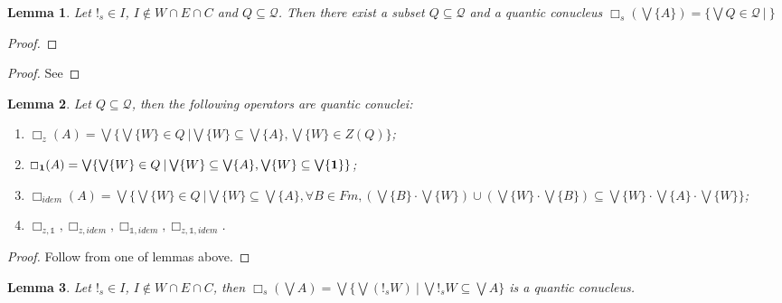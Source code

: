 \documentclass[a4paper]{article}
\newtheorem{lemma}{Lemma}
\begin{document}
\begin{lemma}
  Let $!_s \in I$, $I \notin W \cap E \cap C$ and $Q \subseteq \mathcal{Q}$.
  Then there exist a subset $Q \subseteq \mathcal{Q}$ and
  a quantic conucleus $\Box_s (\bigvee \{ A \}) = \{ \bigvee Q \in \mathcal{Q} \: | \: \}$
\end{lemma}

\begin{proof}
\end{proof}

\begin{proof}
  See
\end{proof}

\begin{lemma} Let $Q \subseteq \mathcal{Q}$, then the following operators are quantic conuclei:
  \begin{enumerate}
    \item $\Box_z (A) = \bigvee \{ \bigvee \{ W \} \in Q \: | \bigvee \{ W \} \subseteq \bigvee \{ A \}, \bigvee \{ W \} \in Z(Q) \}$;
    \item $\Box_{{\bf 1}} (A) = \bigvee \{ \bigvee \{ W \} \in Q \: | \bigvee \{ W \} \subseteq \bigvee \{ A \}, \bigvee \{ W \} \subseteq \bigvee \{ {\bf 1} \} \}$;
    \item $\Box_{idem} (A) = \bigvee \{ \bigvee \{ W \} \in Q \: | \bigvee \{ W \} \subseteq \bigvee \{ A \}, \forall B \in Fm, (\bigvee \{ B \} \cdot \bigvee \{ W \}) \cup (\bigvee \{ W \} \cdot \bigvee \{ B \}) \subseteq \bigvee \{ W \} \cdot \bigvee \{ A \} \cdot \bigvee \{ W \} \}$;
    \item $\Box_{z, \mathds{1}}, \Box_{z, idem}, \Box_{\mathds{1}, idem}, \Box_{z, \mathds{1}, idem}$.
  \end{enumerate}
\end{lemma}

\begin{proof}
  Follow from one of lemmas above.
\end{proof}

\begin{lemma}
  Let $!_s \in I$, $I \notin W \cap E \cap C$,
  then $\Box_s (\bigvee A) = \bigvee \{ \bigvee (!_s W) \: | \: \bigvee !_s W \subseteq \bigvee A \}$
  is a quantic conucleus.
\end{lemma}
\end{document}
